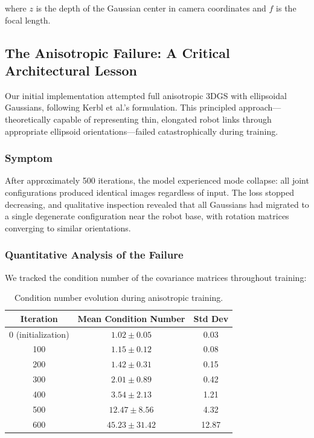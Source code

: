 \documentclass[12pt,a4paper,oneside]{report}
\begin{document}
where $z$ is the depth of the Gaussian center in camera coordinates and $f$ is the focal length.
\subsection{The Anisotropic Failure: A Critical Architectural Lesson}
\label{subsec:the_anisotropic_failure_a_critical_architectural_lesson}

Our initial implementation attempted full anisotropic 3DGS with ellipsoidal Gaussians, following Kerbl et al.'s formulation. This principled approach---theoretically capable of representing thin, elongated robot links through appropriate ellipsoid orientations---failed catastrophically during training.
\subsubsection{Symptom}
\label{subsubsec:symptom}

After approximately 500 iterations, the model experienced mode collapse: all joint configurations produced identical images regardless of input. The loss stopped decreasing, and qualitative inspection revealed that all Gaussians had migrated to a single degenerate configuration near the robot base, with rotation matrices converging to similar orientations.
\subsubsection{Quantitative Analysis of the Failure}
\label{subsubsec:quantitative_analysis_of_the_failure}

We tracked the condition number of the covariance matrices throughout training:
\begin{table}[H]
\centering

\caption{Condition number evolution during anisotropic training.}
\label{tab:condition_number}
\begin{tabular}{ccc}
\toprule

Iteration & Mean Condition Number & Std Dev \\
\midrule

0 (initialization) & $1.02 \pm 0.05$ & 0.03 \\

100 & $1.15 \pm 0.12$ & 0.08 \\

200 & $1.42 \pm 0.31$ & 0.15 \\

300 & $2.01 \pm 0.89$ & 0.42 \\

400 & $3.54 \pm 2.13$ & 1.21 \\

500 & $12.47 \pm 8.56$ & 4.32 \\

600 & $45.23 \pm 31.42$ & 12.87 \\
\bottomrule

\end{tabular}
\end{table}
\end{document}
